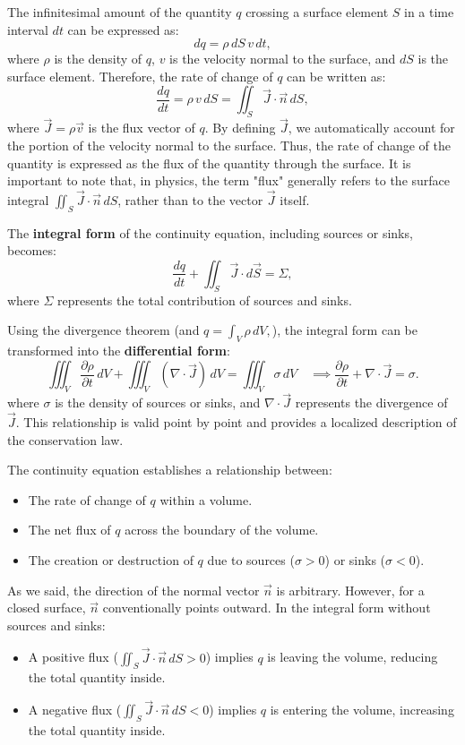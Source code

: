 \documentclass[a4paper]{article}
\begin{document}
The infinitesimal amount of the quantity \( q \) crossing a surface element \( S \) in a time interval \( dt \) can be expressed as:
\[
dq = \rho \, dS \, v \, dt,
\]
where \( \rho \) is the density of \( q \), \( v \) is the velocity normal to the surface, and \( dS \) is the surface element. Therefore, the rate of change of \( q \) can be written as:
\[
\frac{dq}{dt} = \rho \, v \, dS = \iint_S \vec{J} \cdot \vec{n} \, dS,
\]
where \(\vec{J} = \rho \vec{v}\) is the flux vector of \( q \). By defining \( \vec{J} \), we automatically account for the portion of the velocity normal to the surface. Thus, the rate of change of the quantity is expressed as the flux of the quantity through the surface. It is important to note that, in physics, the term "flux" generally refers to the surface integral \(\iint_S \vec{J} \cdot \vec{n} \, dS\), rather than to the vector \( \vec{J} \) itself.


The \textbf{integral form} of the continuity equation, including sources or sinks, becomes:
\[
\frac{dq}{dt} + \iint_S \vec{J} \cdot d\vec{S} = \Sigma,
\]
where \( \Sigma \) represents the total contribution of sources and sinks.



Using the divergence theorem (and  \(
     q = \int_V \rho \, dV,
     \)), the integral form can be transformed into the \textbf{differential form}:
\[
\iiint_V \frac{\partial \rho}{\partial t} \, dV + \iiint_V (\nabla \cdot \vec{J}) \, dV = \iiint_V \sigma \, dV
\quad \implies
\frac{\partial \rho}{\partial t} + \nabla \cdot \vec{J} = \sigma.
\]
where \( \sigma \) is the density of sources or sinks, and \( \nabla \cdot \vec{J} \) represents the divergence of \( \vec{J} \). This relationship is valid point by point and provides a localized description of the conservation law. 


The continuity equation establishes a relationship between:
\begin{itemize}
    \item The rate of change of \( q \) within a volume.
    \item The net flux of \( q \) across the boundary of the volume.
    \item The creation or destruction of \( q \) due to sources (\( \sigma > 0 \)) or sinks (\( \sigma < 0 \)).
\end{itemize}



As we said, the direction of the normal vector \(\vec{n}\) is arbitrary. However, for a closed surface, \(\vec{n}\) conventionally points outward. In the integral form without sources and sinks:
\begin{itemize}
    \item  A positive flux (\( \iint_S \vec{J} \cdot \vec{n} \, dS > 0 \)) implies \( q \) is leaving the volume, reducing the total quantity inside.
\item A negative flux (\( \iint_S \vec{J} \cdot \vec{n} \, dS < 0 \)) implies \( q \) is entering the volume, increasing the total quantity inside.
\end{itemize}
\end{document}
